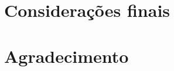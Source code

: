 \documentclass[isoft]{ufgtexposter}
\begin{document}
\begin{poster}
        \section{Considerações finais}
    
            \lipsum[15]
    
        \section{Agradecimento}
    
            \lipsum[57]
    
        
        
    
    
    \end{poster}
\end{document}
